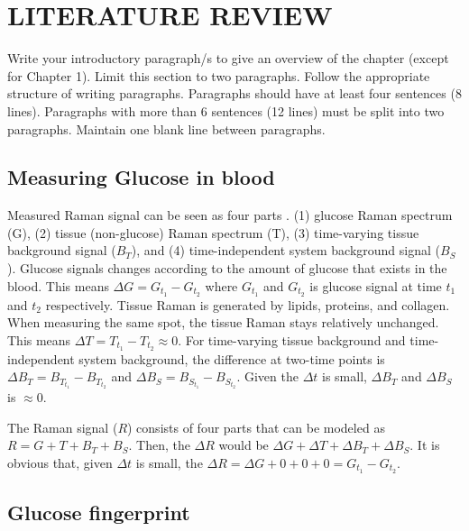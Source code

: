 \setlength{\footskip}{8mm}

\chapter{LITERATURE REVIEW}

Write your introductory paragraph/s to give an overview of the chapter (except for Chapter 1). Limit this section to two paragraphs. Follow the appropriate structure of writing paragraphs. Paragraphs should have at least four sentences (8 lines). Paragraphs with more than 6 sentences (12 lines) must be split into two paragraphs.  Maintain one blank line between paragraphs.

\section{Measuring Glucose in blood}

Measured Raman signal can be seen as four parts \cite{directGlucose}. 
(1) glucose Raman spectrum (G), (2) tissue (non-glucose) Raman spectrum (T), (3) time-varying tissue background signal ($B_T$), and (4) time-independent system background signal ($B_S$).
Glucose signals changes according to the amount of glucose that exists in the blood. 
This means $\Delta G = G_{t_1} - G_{t_2}$ where $G_{t_1}$ and $G_{t_2}$ is glucose signal at time $t_1$ and $t_2$ respectively.
Tissue Raman is generated by lipids, proteins, and collagen. 
When measuring the same spot, the tissue Raman stays relatively unchanged.
This means $\Delta T = T_{t_1} - T_{t_2} \approx 0$.
For time-varying tissue background and time-independent system background, the difference at two-time points is $\Delta B_T = B_{T_{t_1}} - B_{T_{t_2}}$ and $\Delta B_S = B_{S_{t_1}} - B_{S_{t_2}}$.
Given the $\Delta t$ is small, $\Delta B_T$ and $\Delta B_S$ is $\approx 0$.

The Raman signal ($R$) consists of four parts that can be modeled as $R = G + T + B_T + B_S$.
Then, the $\Delta R$ would be $\Delta G + \Delta T + \Delta B_T + \Delta B_S$.
It is obvious that, given $\Delta t$ is small, the $\Delta R = \Delta G + 0 + 0 + 0 = G_{t_1} - G_{t_2}$.




\section{Glucose fingerprint}

